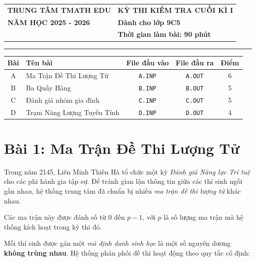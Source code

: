 \begin{tabularx}{\textwidth}{>{\centering\arraybackslash}X >{\centering\arraybackslash}X}
\textbf{TRUNG TÂM TMATH EDU} &
\textbf{KỲ THI KIỂM TRA CUỐI KÌ I} \\

\textbf{NĂM HỌC 2025 - 2026} &
\textbf{Dành cho lớp 9C5} \\

\fbox{\begin{minipage}{2.8cm}
\centering
\textbf{ĐỀ SỐ 1}
\end{minipage}} &
\textbf{Thời gian làm bài: 90 phút} \\
\end{tabularx}

\vspace{0.3cm}
\hrule
\vspace{0.6cm}

\renewcommand{\arraystretch}{1.2}
\begin{tabularx}{\textwidth}{|c|X|c|c|c|}
\hline
\textbf{Bài} & \textbf{Tên bài} & \textbf{File đầu vào} & \textbf{File đầu ra} & \textbf{Điểm} \\
\hline
A & Ma Trận Đề Thi Lượng Tử & \texttt{A.INP} & \texttt{A.OUT} & 6 \\
\hline
B & Ba Quầy Hàng & \texttt{B.INP} & \texttt{B.OUT} & 5 \\
\hline
C & Đánh giá nhóm gia đình & \texttt{C.INP} & \texttt{C.OUT} & 5 \\
\hline
D & Trạm Năng Lượng Tuyến Tính & \texttt{D.INP} & \texttt{D.OUT} & 4 \\
\hline
\end{tabularx}

\section*{Bài 1: Ma Trận Đề Thi Lượng Tử}

Trong năm 2145, Liên Minh Thiên Hà tổ chức một kỳ \emph{Đánh giá Năng lực Trí tuệ} cho các phi hành gia tập sự.
Để tránh gian lận thông tin giữa các thí sinh ngồi gần nhau, hệ thống trung tâm đã chuẩn bị nhiều \emph{ma trận đề thi lượng tử} khác nhau.

Các ma trận này được đánh số từ $0$ đến $p-1$, với $p$ là số lượng ma trận mà hệ thống kích hoạt trong kỳ thi đó.

Mỗi thí sinh được gán một \emph{mã định danh sinh học} là một số nguyên dương \textbf{không trùng nhau}.  
Hệ thống phân phối đề thi hoạt động theo quy tắc cố định:


